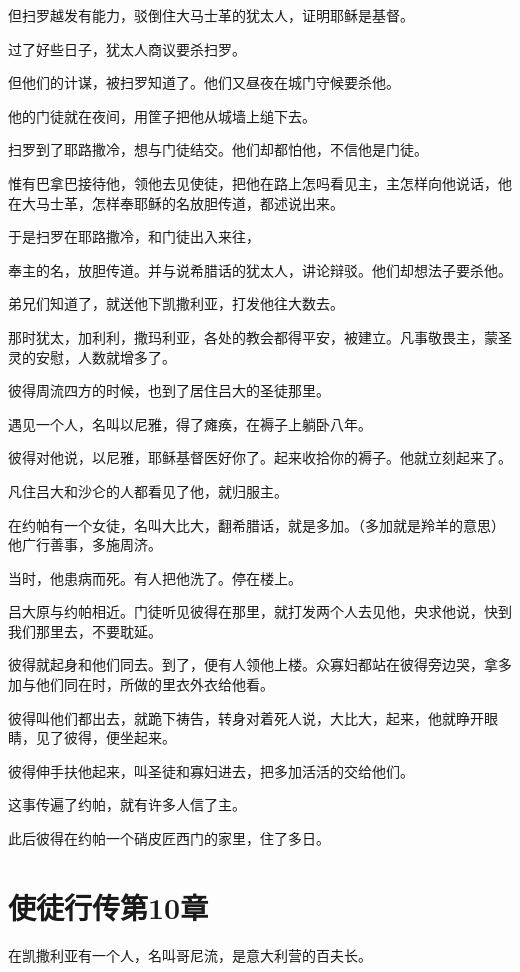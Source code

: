 \documentclass[12pt,oneside]{book}
\begin{document}
但扫罗越发有能力，驳倒住大马士革的犹太人，证明耶稣是基督。

过了好些日子，犹太人商议要杀扫罗。

但他们的计谋，被扫罗知道了。他们又昼夜在城门守候要杀他。

他的门徒就在夜间，用筐子把他从城墙上缒下去。

扫罗到了耶路撒冷，想与门徒结交。他们却都怕他，不信他是门徒。

惟有巴拿巴接待他，领他去见使徒，把他在路上怎吗看见主，主怎样向他说话，他在大马士革，怎样奉耶稣的名放胆传道，都述说出来。

于是扫罗在耶路撒冷，和门徒出入来往，

奉主的名，放胆传道。并与说希腊话的犹太人，讲论辩驳。他们却想法子要杀他。

弟兄们知道了，就送他下凯撒利亚，打发他往大数去。

那时犹太，加利利，撒玛利亚，各处的教会都得平安，被建立。凡事敬畏主，蒙圣灵的安慰，人数就增多了。

彼得周流四方的时候，也到了居住吕大的圣徒那里。

遇见一个人，名叫以尼雅，得了瘫痪，在褥子上躺卧八年。

彼得对他说，以尼雅，耶稣基督医好你了。起来收拾你的褥子。他就立刻起来了。

凡住吕大和沙仑的人都看见了他，就归服主。

在约帕有一个女徒，名叫大比大，翻希腊话，就是多加。（多加就是羚羊的意思）他广行善事，多施周济。

当时，他患病而死。有人把他洗了。停在楼上。

吕大原与约帕相近。门徒听见彼得在那里，就打发两个人去见他，央求他说，快到我们那里去，不要耽延。

彼得就起身和他们同去。到了，便有人领他上楼。众寡妇都站在彼得旁边哭，拿多加与他们同在时，所做的里衣外衣给他看。

彼得叫他们都出去，就跪下祷告，转身对着死人说，大比大，起来，他就睁开眼睛，见了彼得，便坐起来。

彼得伸手扶他起来，叫圣徒和寡妇进去，把多加活活的交给他们。

这事传遍了约帕，就有许多人信了主。

此后彼得在约帕一个硝皮匠西门的家里，住了多日。

\chapter{使徒行传第10章}
在凯撒利亚有一个人，名叫哥尼流，是意大利营的百夫长。
\end{document}
